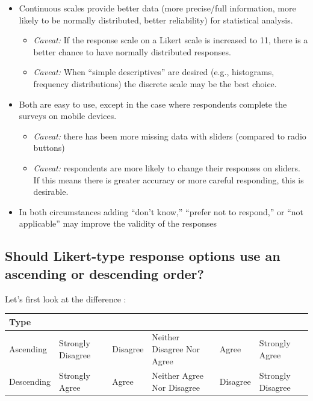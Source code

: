 \documentclass[
  english,
]{book}
\providecommand{\tightlist}{%
  \setlength{\itemsep}{0pt}\setlength{\parskip}{0pt}}
\begin{document}
\begin{itemize}
\tightlist
\item
  Continuous scales provide better data (more precise/full information, more likely to be normally distributed, better reliability) for statistical analysis.

  \begin{itemize}
  \tightlist
  \item
    \emph{Caveat:} If the response scale on a Likert scale is increased to 11, there is a better chance to have normally distributed responses.
  \item
    \emph{Caveat:} When ``simple descriptives'' are desired (e.g., histograms, frequency distributions) the discrete scale may be the best choice.
  \end{itemize}
\item
  Both are easy to use, except in the case where respondents complete the surveys on mobile devices.

  \begin{itemize}
  \tightlist
  \item
    \emph{Caveat:} there has been more missing data with sliders (compared to radio buttons)
  \item
    \emph{Caveat:} respondents are more likely to change their responses on sliders. If this means there is greater accuracy or more careful responding, this is desirable.
  \end{itemize}
\item
  In both circumstances adding ``don't know,'' ``prefer not to respond,'' or ``not applicable'' may improve the validity of the responses
\end{itemize}

\hypertarget{should-likert-type-response-options-use-an-ascending-or-descending-order}{%
\subsection{Should Likert-type response options use an ascending or descending order?}\label{should-likert-type-response-options-use-an-ascending-or-descending-order}}

Let's first look at the difference \citep{chyung_evidence-based_2018}:

\begin{longtable}[]{@{}
  >{\raggedright\arraybackslash}p{}
  >{\raggedright\arraybackslash}p{}
  >{\raggedright\arraybackslash}p{}
  >{\raggedright\arraybackslash}p{}
  >{\raggedright\arraybackslash}p{}
  >{\raggedright\arraybackslash}p{}@{}}
\toprule
Type & & & & & \\
\midrule
\endhead
Ascending & Strongly Disagree & Disagree & Neither Disagree Nor Agree & Agree & Strongly Agree \\
Descending & Strongly Agree & Agree & Neither Agree Nor Disagree & Disagree & Strongly Disagree \\
\bottomrule
\end{longtable}
\end{document}
